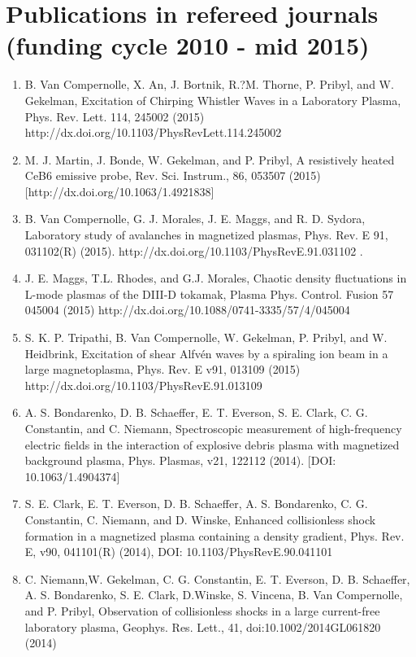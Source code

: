 \documentclass[11pt]{article}
\date{}
\title{}
\begin{document}
\section{Publications in refereed journals (funding cycle 2010 - mid 2015)}
 \begin{enumerate}

\item B. Van Compernolle, X. An, J. Bortnik, R.?M. Thorne, P. Pribyl, and W. Gekelman, Excitation of Chirping Whistler Waves in a Laboratory Plasma, Phys. Rev. Lett. 114, 245002 (2015) http://dx.doi.org/10.1103/PhysRevLett.114.245002

\item M. J. Martin, J. Bonde, W. Gekelman, and P. Pribyl, A resistively heated CeB6 emissive probe, Rev. Sci. Instrum., 86, 053507 (2015) [http://dx.doi.org/10.1063/1.4921838]

\item B. Van Compernolle, G. J. Morales, J. E. Maggs, and R. D. Sydora, Laboratory study of avalanches in magnetized plasmas, Phys. Rev. E 91, 031102(R) (2015). http://dx.doi.org/10.1103/PhysRevE.91.031102 .

\item J. E. Maggs, T.L. Rhodes, and G.J. Morales, Chaotic density fluctuations in L-mode plasmas of the DIII-D tokamak, Plasma Phys. Control. Fusion 57 045004 (2015) http://dx.doi.org/10.1088/0741-3335/57/4/045004

\item S. K. P. Tripathi, B. Van Compernolle, W. Gekelman, P. Pribyl, and W. Heidbrink, Excitation of shear Alfv\'{e}n waves by a spiraling ion beam in a large magnetoplasma, Phys. Rev. E v91, 013109 (2015) http://dx.doi.org/10.1103/PhysRevE.91.013109

\item   A. S. Bondarenko, D. B. Schaeffer, E. T. Everson, S. E. Clark, C. G. Constantin, and C. Niemann, Spectroscopic measurement of high-frequency electric fields in the interaction of explosive debris plasma with magnetized background plasma, Phys. Plasmas, v21, 122112 (2014). [DOI: 10.1063/1.4904374]

\item   S. E. Clark, E. T. Everson, D. B. Schaeffer, A. S. Bondarenko, C. G. Constantin, C. Niemann, and D. Winske, Enhanced collisionless shock formation in a magnetized plasma containing a density gradient, Phys. Rev. E, v90, 041101(R) (2014), DOI: 10.1103/PhysRevE.90.041101

\item    C. Niemann,W. Gekelman, C. G. Constantin, E. T. Everson, D. B. Schaeffer, A. S. Bondarenko, S. E. Clark, D.Winske, S. Vincena, B. Van Compernolle, and P. Pribyl, Observation of collisionless shocks in a large current-free laboratory plasma, Geophys. Res. Lett., 41, doi:10.1002/2014GL061820 (2014)


\end{enumerate}
\end{document}
